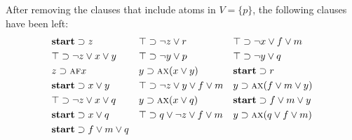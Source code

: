 \documentclass[letterpaper]{article} %
\begin{document}
\begin{example}\label{examp:remA}
After removing the clauses that include atoms in $V=\{p\}$, the following clauses have been left:
\begin{align*}
& \textbf{start}\supset z &&  \top \supset \neg z \vee r && \top \supset \neg x\vee f \vee m\\
&  \top \supset \neg z \vee x \vee y &&  \top \supset \neg y \vee p &&  \top \supset \neg y \vee q\\
&  z \supset \textsc{a} \textsc{f} x &&   y \supset \textsc{a} \textsc{x}(x\vee y) && \textbf{start} \supset r \\
& \textbf{start} \supset x \vee y && \top \supset \neg z \vee y \vee f \vee m && y \supset \textsc{a}\textsc{x}(f\vee m\vee y)\\
& \top \supset \neg z \vee x \vee q && y \supset \textsc{a}\textsc{x}(x\vee q) &&  \textbf{start} \supset f\vee m \vee y \\
& \textbf{start} \supset x \vee q && \top \supset q \vee \neg z \vee f \vee m && y \supset \textsc{a}\textsc{x}(q \vee f\vee m) \\
& \textbf{start} \supset f\vee m \vee q
\end{align*}
\end{example}
\end{document}
